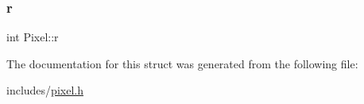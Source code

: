 \mbox{\label{structPixel_a8bdcc8f589c30333ec3f88d2c26d4e3a}} 
\subsubsection{\texorpdfstring{r}{r}}
{\footnotesize\ttfamily int Pixel\+::r}



The documentation for this struct was generated from the following file\+:\begin{DoxyCompactItemize}
\item 
includes/\hyperlink{pixel_8h}{pixel.\+h}\end{DoxyCompactItemize}

